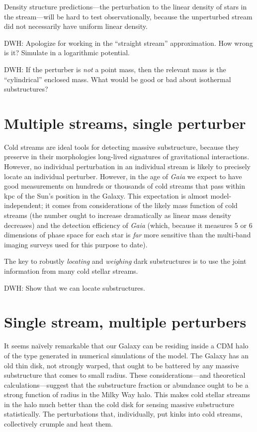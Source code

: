 \documentclass[12pt,preprint]{aastex}
\newcommand{\project}[1]{\textsl{#1}}
\begin{document}
Density structure predictions---the perturbation to the linear density
of stars in the stream---will be hard to test observationally, because
the unperturbed stream did not necessarily have uniform linear
density.

DWH: Apologize for working in the ``straight stream'' approximation.
How wrong is it?  Simulate in a logarithmic potential.

DWH: If the perturber is \emph{not} a point mass, then the relevant
mass is the ``cylindrical'' enclosed mass.  What would be good or bad
about isothermal substructures?

\section{Multiple streams, single perturber}

Cold streams are ideal tools for detecting massive substructure,
because they preserve in their morphologies long-lived signatures of
gravitational interactions.  However, no individual perturbation in an
individual stream is likely to precisely locate an individual
perturber.  However, in the age of \project{Gaia} we expect to have
good measurements on hundreds or thousands of cold streams that pass
within kpc of the Sun's position in the Galaxy.  This expectation is
almost model-independent; it comes from considerations of the likely
mass function of cold streams (the number ought to increase
dramatically as linear mass density decreases) and the detection
efficiency of \project{Gaia} (which, because it measures 5 or 6
dimensions of phase space for each star is \emph{far} more sensitive
than the multi-band imaging surveys used for this purpose to date).

The key to robustly \emph{locating} and \emph{weighing} dark
substructures is to use the joint information from many cold stellar
streams.


DWH: Show that we can locate substructures.

\section{Single stream, multiple perturbers}

It seems na\"ively remarkable that our Galaxy can be residing inside a
CDM halo of the type generated in numerical simulations of the
model. The Galaxy has an old thin disk, not strongly warped, that
ought to be battered by any massive substructure that comes to small
radius.  These considerations---and theoretical calculations---suggest
that the substructure fraction or abundance ought to be a strong
function of radius in the Milky Way halo.  This makes cold stellar
streams in the halo much better than the cold disk for sensing massive
substructure statistically.  The perturbations that, individually, put
kinks into cold streams, collectively crumple and heat them.
\end{document}
